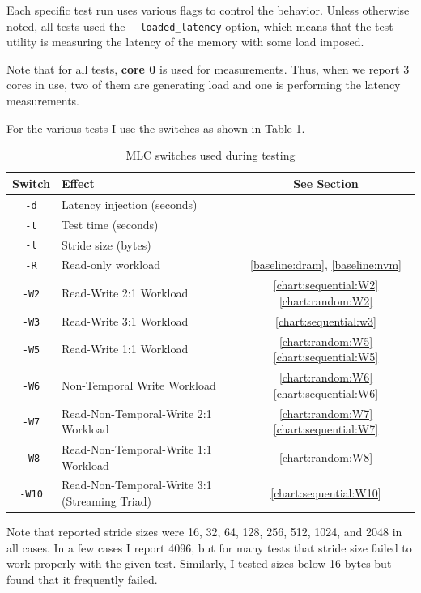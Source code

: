 Each specific test run uses various flags to control the behavior.  Unless
otherwise noted, all tests used the \verb+--loaded_latency+ option, which
means that the test utility is measuring the latency of the memory with
some load imposed.

Note that for all tests, \textbf{core 0} is used for measurements.  Thus, when
we report 3 cores in use, two of them are generating load and one is performing
the latency measurements.

For the various tests I use the switches as shown in Table \ref{mlc:switches}.

\begin{table}
    \caption{MLC switches used during testing}\label{mlc:switches}
    \begin{tabular}{@{}clc@{}}
        Switch & Effect & See Section \\ \toprule
        \verb+-d+ & Latency injection (seconds) &  \\
        \verb+-t+ & Test time (seconds) &  \\
        \verb+-l+ & Stride size (bytes) & \\
        \verb+-R+ & Read-only workload & \ref{baseline:dram}, \ref{baseline:nvm} \\
        \verb+-W2+ & Read-Write 2:1 Workload & \ref{chart:sequential:W2} \ref{chart:random:W2} \\ 
        \verb+-W3+ & Read-Write 3:1 Workload & \ref{chart:sequential:w3} \\
        \verb+-W5+ & Read-Write 1:1 Workload & \ref{chart:random:W5} \ref{chart:sequential:W5} \\
        \verb+-W6+ & Non-Temporal Write Workload & \ref{chart:random:W6} \ref{chart:sequential:W6} \\
        \verb+-W7+ & Read-Non-Temporal-Write 2:1 Workload & \ref{chart:random:W7} \ref{chart:sequential:W7} \\
        \verb+-W8+ & Read-Non-Temporal-Write 1:1 Workload  & \ref{chart:random:W8} \\
        \verb+-W10+ & Read-Non-Temporal-Write 3:1 (Streaming Triad) & \ref{chart:sequential:W10} \\ \bottomrule
    \end{tabular}%
\end{table}

Note that reported stride sizes were 16, 32, 64, 128, 256, 512, 1024, and 2048 in all cases.
In a few cases I report 4096, but for many tests that stride size failed to work properly
with the given test.  Similarly, I tested sizes below 16 bytes but found that it frequently
failed.

